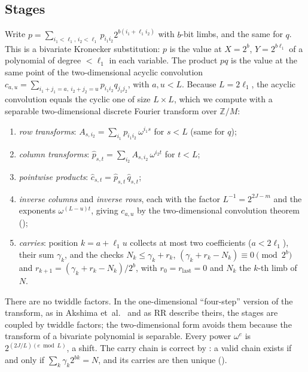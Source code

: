 \documentclass[10pt]{amsart}
\theoremstyle{plain}
\theoremstyle{definition}
\theoremstyle{remark}
\numberwithin{equation}{section}
\newcommand{\Z}{\mathbb{Z}}
\begin{document}
\subsection{Stages}
Write $p=\sum_{i_1<\ell_1,\,i_2<\ell_1}p_{i_1i_2}2^{b(i_1+\ell_1i_2)}$ with $b$-bit limbs, and the same for $q$.
This is a bivariate Kronecker substitution: $p$ is the value at $X=2^b$, $Y=2^{b\ell_1}$ of a polynomial
of degree $<\ell_1$ in each variable. The product $pq$ is the value at the same point of the
two-dimensional acyclic convolution $c_{a,u}=\sum_{i_1+j_1=a,\ i_2+j_2=u}p_{i_1i_2}q_{j_1j_2}$, with
$a,u<L$. Because $L=2\ell_1$, the acyclic convolution equals the cyclic one of size $L\times L$, which we
compute with a separable two-dimensional discrete Fourier transform over $\Z/M$:
\begin{enumerate}[label=(\roman*)]
\item \emph{row transforms}: $A_{s,i_2}=\sum_{i_1}p_{i_1i_2}\,\omega^{i_1s}$ for $s<L$ (same for $q$);
\item \emph{column transforms}: $\hat p_{s,t}=\sum_{i_2}A_{s,i_2}\,\omega^{i_2t}$ for $t<L$;
\item \emph{pointwise products}: $\hat c_{s,t}=\hat p_{s,t}\,\hat q_{s,t}$;
\item \emph{inverse columns} and \emph{inverse rows}, each with the factor $L^{-1}=2^{2J-m}$ and the
exponents $\omega^{(L-u)t}$, giving $c_{a,u}$ by the two-dimensional convolution theorem
();
\item \emph{carries}: position $k=a+\ell_1u$ collects at most two coefficients ($a<2\ell_1$), their sum
$\gamma_k$, and the checks $N_k\le\gamma_k+r_k$, $(\gamma_k+r_k-N_k)\equiv0\pmod{2^b}$ and
$r_{k+1}=(\gamma_k+r_k-N_k)/2^b$, with $r_0=r_{\mathrm{last}}=0$ and $N_k$ the $k$-th limb of $N$.
\end{enumerate}
There are no twiddle factors. In the one-dimensional ``four-step'' version of the transform, as in
Akshima et~al.~\cite{AK26} and as RR describe theirs, the stages are coupled by twiddle factors; the
two-dimensional form avoids them because the transform of a bivariate polynomial is separable.
Every power $\omega^e$ is $2^{(2J/L)(e\bmod L)}$, a shift. The carry chain is correct by
: a valid chain exists if and only if $\sum_k\gamma_k2^{bk}=N$, and its carries are then
unique ().
\end{document}
